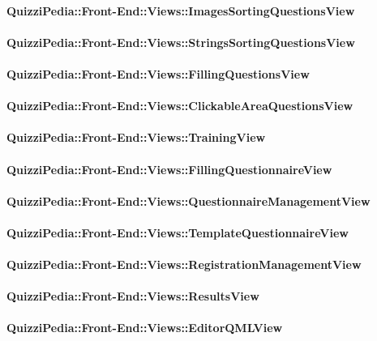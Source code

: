 \paragraph{QuizziPedia::Front-End::Views::ImagesSortingQuestionsView}
\paragraph{QuizziPedia::Front-End::Views::StringsSortingQuestionsView}
\paragraph{QuizziPedia::Front-End::Views::FillingQuestionsView}
\paragraph{QuizziPedia::Front-End::Views::ClickableAreaQuestionsView}
\paragraph{QuizziPedia::Front-End::Views::TrainingView}
\paragraph{QuizziPedia::Front-End::Views::FillingQuestionnaireView}
\paragraph{QuizziPedia::Front-End::Views::QuestionnaireManagementView}
\paragraph{QuizziPedia::Front-End::Views::TemplateQuestionnaireView}
\paragraph{QuizziPedia::Front-End::Views::RegistrationManagementView}
\paragraph{QuizziPedia::Front-End::Views::ResultsView}
\paragraph{QuizziPedia::Front-End::Views::EditorQMLView}
